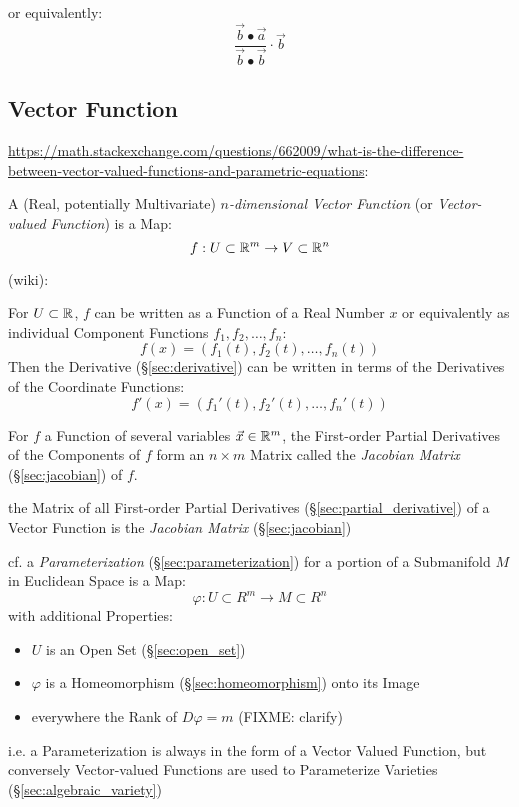 or equivalently:
\[
\frac{\vec{b} \bullet \vec{a}}
  {\vec{b} \bullet \vec{b}} \cdot \vec{b}
\]



\subsection{Vector Function}\label{sec:vector_function}

\url{https://math.stackexchange.com/questions/662009/what-is-the-difference-between-vector-valued-functions-and-parametric-equations}:

A (Real, potentially Multivariate) \emph{$n$-dimensional Vector Function} (or
\emph{Vector-valued Function}) is a Map:
\[
  f : U \subset \mathbb{R}^m \rightarrow V \subset \mathbb{R}^n
\]

(wiki):

For $U \subset \mathbb{R}$, $f$ can be written as a Function of a Real Number $x$ or
equivalently as individual Component Functions $f_1, f_2, \ldots, f_n$:
\[
  f(x) = (f_1(t), f_2(t), \ldots, f_n(t))
\]
Then the Derivative (\S\ref{sec:derivative}) can be written in terms of the
Derivatives of the Coordinate Functions:
\[
  f'(x) = (f_1'(t), f_2'(t), \ldots, f_n'(t))
\]

For $f$ a Function of several variables $\vec{x} \in \mathbb{R}^m$, the First-order
Partial Derivatives of the Components of $f$ form an $n \times m$ Matrix called
the \emph{Jacobian Matrix} (\S\ref{sec:jacobian}) of $f$.

the Matrix of all First-order Partial Derivatives
(\S\ref{sec:partial_derivative}) of a Vector Function is the \emph{Jacobian
  Matrix} (\S\ref{sec:jacobian})

\fist cf. a \emph{Parameterization} (\S\ref{sec:parameterization}) for a
portion of a Submanifold $M$ in Euclidean Space is a Map:
\[
  \varphi : U \subset R^m \rightarrow M \subset R^n
\]
with additional Properties:
\begin{itemize}
  \item $U$ is an Open Set (\S\ref{sec:open_set})
  \item $\varphi$ is a Homeomorphism (\S\ref{sec:homeomorphism}) onto its Image
  \item everywhere the Rank of $D\varphi = m$ (FIXME: clarify)
\end{itemize}
i.e. a Parameterization is always in the form of a Vector Valued Function, but
conversely Vector-valued Functions are used to Parameterize Varieties
(\S\ref{sec:algebraic_variety}) %

